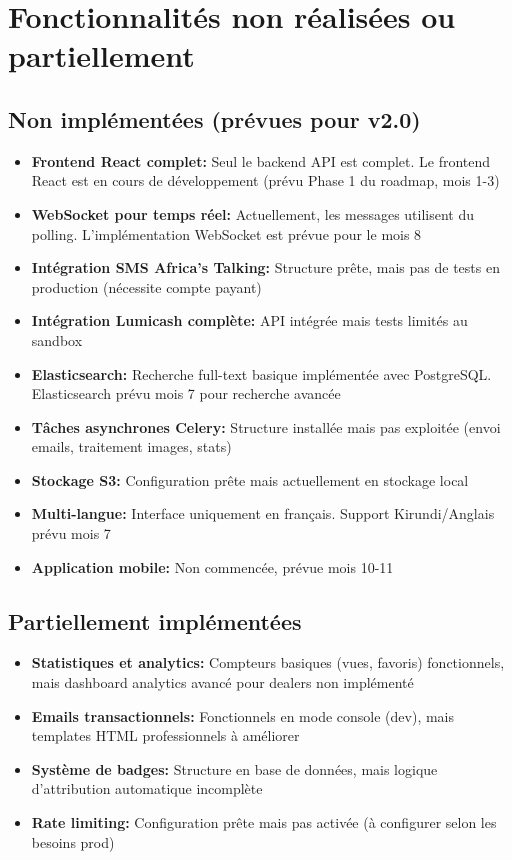 \section{Fonctionnalités non réalisées ou partiellement}

\subsection{Non implémentées (prévues pour v2.0)}

\begin{itemize}
    \item \textbf{Frontend React complet:} Seul le backend API est complet. Le frontend React est en cours de développement (prévu Phase 1 du roadmap, mois 1-3)
    \item \textbf{WebSocket pour temps réel:} Actuellement, les messages utilisent du polling. L'implémentation WebSocket est prévue pour le mois 8
    \item \textbf{Intégration SMS Africa's Talking:} Structure prête, mais pas de tests en production (nécessite compte payant)
    \item \textbf{Intégration Lumicash complète:} API intégrée mais tests limités au sandbox
    \item \textbf{Elasticsearch:} Recherche full-text basique implémentée avec PostgreSQL. Elasticsearch prévu mois 7 pour recherche avancée
    \item \textbf{Tâches asynchrones Celery:} Structure installée mais pas exploitée (envoi emails, traitement images, stats)
    \item \textbf{Stockage S3:} Configuration prête mais actuellement en stockage local
    \item \textbf{Multi-langue:} Interface uniquement en français. Support Kirundi/Anglais prévu mois 7
    \item \textbf{Application mobile:} Non commencée, prévue mois 10-11
\end{itemize}

\subsection{Partiellement implémentées}

\begin{itemize}
    \item \textbf{Statistiques et analytics:} Compteurs basiques (vues, favoris) fonctionnels, mais dashboard analytics avancé pour dealers non implémenté
    \item \textbf{Emails transactionnels:} Fonctionnels en mode console (dev), mais templates HTML professionnels à améliorer
    \item \textbf{Système de badges:} Structure en base de données, mais logique d'attribution automatique incomplète
    \item \textbf{Rate limiting:} Configuration prête mais pas activée (à configurer selon les besoins prod)
\end{itemize}

